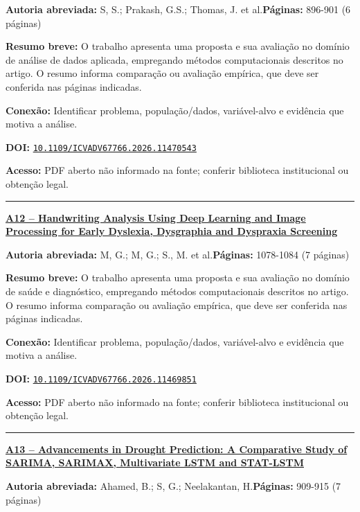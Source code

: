 \documentclass[10pt,a4paper]{article}
\begin{document}
\textbf{Autoria abreviada:} S, S.; Prakash, G.S.; Thomas, J. et al.\quad \textbf{Páginas:} 896-901 (6 páginas)\par
\textbf{Resumo breve:} O trabalho apresenta uma proposta e sua avaliação no domínio de análise de dados aplicada, empregando métodos computacionais descritos no artigo. O resumo informa comparação ou avaliação empírica, que deve ser conferida nas páginas indicadas.\par
\textbf{Conexão:} Identificar problema, população/dados, variável-alvo e evidência que motiva a análise.\par
\textbf{DOI:} \href{https://doi.org/10.1109/ICVADV67766.2026.11470543}{\nolinkurl{10.1109/ICVADV67766.2026.11470543}}\par
\textbf{Acesso:} PDF aberto não informado na fonte; conferir biblioteca institucional ou obtenção legal.\par
\noindent\rule{\textwidth}{0.35pt}
\par\medskip\noindent
{\large\bfseries\href{https://doi.org/10.1109/ICVADV67766.2026.11469851}{A12 -- Handwriting Analysis Using Deep Learning and Image Processing for Early Dyslexia, Dysgraphia and Dyspraxia Screening}}\par\smallskip
\textbf{Autoria abreviada:} M, G.; M, G.; S., M. et al.\quad \textbf{Páginas:} 1078-1084 (7 páginas)\par
\textbf{Resumo breve:} O trabalho apresenta uma proposta e sua avaliação no domínio de saúde e diagnóstico, empregando métodos computacionais descritos no artigo. O resumo informa comparação ou avaliação empírica, que deve ser conferida nas páginas indicadas.\par
\textbf{Conexão:} Identificar problema, população/dados, variável-alvo e evidência que motiva a análise.\par
\textbf{DOI:} \href{https://doi.org/10.1109/ICVADV67766.2026.11469851}{\nolinkurl{10.1109/ICVADV67766.2026.11469851}}\par
\textbf{Acesso:} PDF aberto não informado na fonte; conferir biblioteca institucional ou obtenção legal.\par
\noindent\rule{\textwidth}{0.35pt}
\par\medskip\noindent
{\large\bfseries\href{https://doi.org/10.1109/ICVADV67766.2026.11470520}{A13 -- Advancements in Drought Prediction: A Comparative Study of SARIMA, SARIMAX, Multivariate LSTM and STAT-LSTM}}\par\smallskip
\textbf{Autoria abreviada:} Ahamed, B.; S, G.; Neelakantan, H.\quad \textbf{Páginas:} 909-915 (7 páginas)\par
\end{document}
